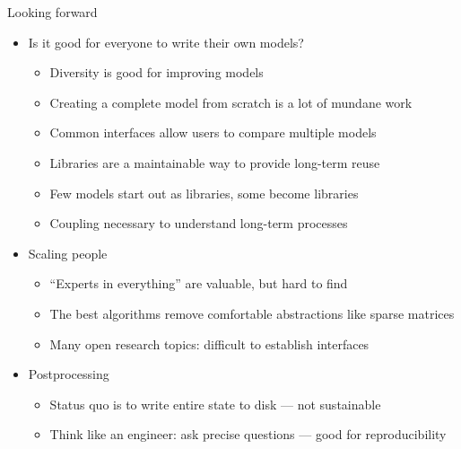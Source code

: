 \documentclass{beamer}
\begin{document}
\begin{frame}{Looking forward}
  \begin{itemize}
  \item Is it good for everyone to write their own models?
    \begin{itemize}
    \item Diversity is good for improving models
    \item Creating a complete model from scratch is a lot of mundane work
    \item Common interfaces allow users to compare multiple models
    \item Libraries are a maintainable way to provide long-term reuse
    \item Few models start out as libraries, some become libraries
    \item Coupling necessary to understand long-term processes
    \end{itemize}
  \item Scaling people
    \begin{itemize}
    \item ``Experts in everything'' are valuable, but hard to find
    \item The best algorithms remove comfortable abstractions like sparse matrices
    \item Many open research topics: difficult to establish interfaces
    \end{itemize}
  \item Postprocessing
    \begin{itemize}
    \item Status quo is to write entire state to disk --- not sustainable
    \item Think like an engineer: ask precise questions --- good for reproducibility
    \end{itemize}
  \end{itemize}
\end{frame}
\end{document}
